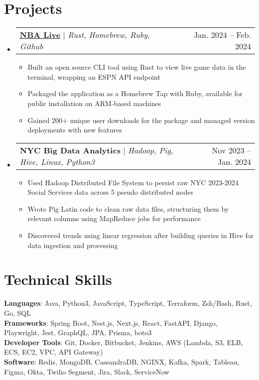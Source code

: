 \documentclass[letterpaper,11pt]{article}
\makeatletter
\newcommand{\resumeItem}[1]{
  \item\small{
    {#1 \vspace{-2pt}}
  }
}
\newcommand{\resumeProjectHeading}[2]{
    \item
    \begin{tabular*}{0.97\textwidth}{l@{\extracolsep{\fill}}r}
      \small#1 & #2 \\
    \end{tabular*}\vspace{-7pt}
}
\newcommand{\resumeSubHeadingListStart}{\begin{itemize}[leftmargin=0.15in, label={}]}
\newcommand{\resumeSubHeadingListEnd}{\end{itemize}}
\newcommand{\resumeItemListStart}{\begin{itemize}}
\newcommand{\resumeItemListEnd}{\end{itemize}\vspace{-5pt}}
\makeatother
\begin{document}
\section{Projects}
    \resumeSubHeadingListStart
      \resumeProjectHeading
          {\textbf{\href{https://github.com/udaypatel1/nba-live-rust}{NBA Live}} $|$ \emph{Rust, Homebrew, Ruby, Github}}{Jan. 2024 -- Feb. 2024}
          \resumeItemListStart
            \resumeItem{Built an open source CLI tool using Rust to view live game data in the terminal, wrapping an ESPN API endpoint}
            \resumeItem{Packaged the application as a Homebrew Tap with Ruby, available for public installation on ARM-based machines} 
            \resumeItem{Gained 200+ unique user downloads for the package and managed version deployments with new features}
          \resumeItemListEnd
      \resumeProjectHeading
          {\textbf{NYC Big Data Analytics} $|$ \emph{Hadoop, Pig, Hive, Linux, Python3}}{Nov 2023 -- Jan. 2024}
          \resumeItemListStart
            \resumeItem{Used Hadoop Distributed File System to persist raw NYC 2023-2024 Social Services data across 5 pseudo distributed nodes}
            \resumeItem{Wrote Pig Latin code to clean raw data files, structuring them by relevant columns using MapReduce jobs for performance}
            \resumeItem{Discovered trends using linear regression after building queries in Hive for data ingestion and processing}
          \resumeItemListEnd
    \resumeSubHeadingListEnd
%
\section{Technical Skills}
 \begin{itemize}[leftmargin=0.15in, label={}]
    \small{\item{
     \textbf{Languages}{: Java, Python3, JavaScript, TypeScript, Terraform, Zsh/Bash, Rust, Go, SQL} \\
     \textbf{Frameworks}{: Spring Boot, Nest.js, Next.js, React, FastAPI, Django, Playwright, Jest, GraphQL, JPA, Prisma, boto3} \\
     \textbf{Developer Tools}{: Git, Docker, Bitbucket, Jenkins, AWS (Lambda, S3, ELB, ECS, EC2, VPC, API Gateway)} \\
     \textbf{Software}{: Redis, MongoDB, CassandraDB, NGINX, Kafka, Spark, Tableau, Figma, Okta, Twilio Segment, Jira, Slack, ServiceNow}
    }}
 \end{itemize}


\end{document}
